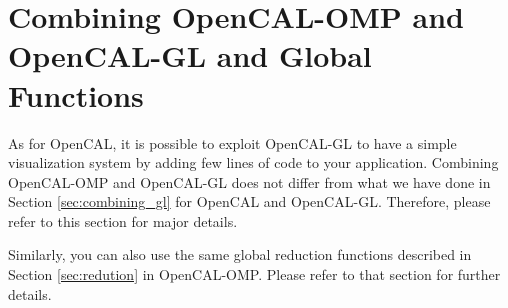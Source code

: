 \section{Combining OpenCAL-OMP and OpenCAL-GL and Global Functions}

As for OpenCAL, it is possible to exploit OpenCAL-GL to have a simple
visualization system by adding few lines of code to your
application. Combining OpenCAL-OMP and OpenCAL-GL does not differ from
what we have done in Section \ref{sec:combining_gl} for OpenCAL and
OpenCAL-GL. Therefore, please refer to this section for major details.

Similarly, you can also use the same global reduction functions
described in Section \ref{sec:redution} in OpenCAL-OMP. Please refer to
that section for further details.
